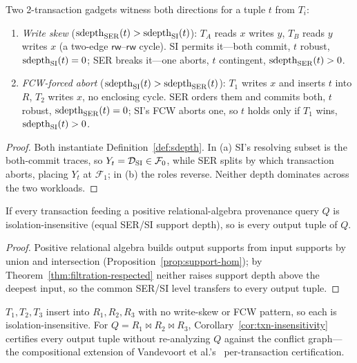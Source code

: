\begin{proposition}
  \label{prop:ser-si-incomparable}
  Two 2-transaction gadgets witness both directions for a tuple $t$ from $T_i$:
  \begin{enumerate}[nosep,label=(\alph*)]
    \item \emph{Write skew} ($\operatorname{sdepth}_{\mathrm{SER}}(t) > \operatorname{sdepth}_{\mathrm{SI}}(t)$):
          $T_A$ reads $x$ writes $y$, $T_B$ reads $y$ writes $x$ (a two-edge
          $\mathsf{rw}$--$\mathsf{rw}$ cycle). SI permits it---both commit, $t$
          robust, $\operatorname{sdepth}_{\mathrm{SI}}(t) = 0$; SER breaks it---one aborts, $t$
          contingent, $\operatorname{sdepth}_{\mathrm{SER}}(t) > 0$.
    \item \emph{FCW-forced abort} ($\operatorname{sdepth}_{\mathrm{SI}}(t) > \operatorname{sdepth}_{\mathrm{SER}}(t)$):
          $T_1$ writes $x$ and inserts $t$ into $R$, $T_2$ writes $x$, no
          enclosing cycle. SER orders them and commits both, $t$ robust,
          $\operatorname{sdepth}_{\mathrm{SER}}(t) = 0$; SI's FCW aborts one, so $t$ holds only
          if $T_1$ wins, $\operatorname{sdepth}_{\mathrm{SI}}(t) > 0$.
  \end{enumerate}
\end{proposition}
\begin{proof}
  Both instantiate Definition~\ref{def:sdepth}. In (a) SI's resolving subset is
  the both-commit traces, so $Y_t = \mathcal{D}_{\mathrm{SI}} \in \mathcal F_0$, while
  SER splits by which transaction aborts, placing $Y_t$ at $\mathcal F_1$; in
  (b) the roles reverse. Neither depth dominates across the two workloads.
\end{proof}

\begin{corollary}
  \label{cor:txn-insensitivity}
  If every transaction feeding a positive relational-algebra provenance query
  $Q$ is isolation-insensitive (equal SER/SI support depth), so is every output
  tuple of $Q$.
\end{corollary}
\begin{proof}
  Positive relational algebra builds output supports from input supports by
  union and intersection (Proposition~\ref{prop:support-hom}); by
  Theorem~\ref{thm:filtration-respected} neither raises support depth above the
  deepest input, so the common SER/SI level transfers to every output tuple.
\end{proof}

\begin{example}
  \label{ex:txn-compose}
  $T_1,T_2,T_3$ insert into $R_1,R_2,R_3$ with no write-skew or FCW pattern, so
  each is isolation-insensitive. For $Q = R_1 \bowtie R_2 \bowtie R_3$,
  Corollary~\ref{cor:txn-insensitivity} certifies every output tuple without
  re-analyzing $Q$ against the conflict graph---the compositional extension of
  Vandevoort et al.'s~\cite{vandevoort2025mixed} per-transaction certification.
\end{example}

